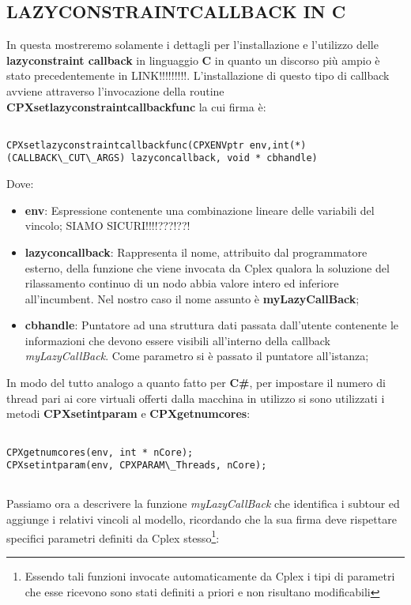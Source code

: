\documentclass[11pt]{article}
\begin{document}
\subsection*{LAZYCONSTRAINTCALLBACK IN C}
\label{sec:LazyDueS}

In questa mostreremo solamente i dettagli per l'installazione e l'utilizzo delle \textbf{lazyconstraint callback} in linguaggio \textbf{C} in quanto un discorso più ampio è stato precedentemente in LINK!!!!!!!!!.
L'installazione di questo tipo di callback avviene attraverso l'invocazione della routine \textbf{CPXsetlazyconstraintcallbackfunc} la cui firma è:

\begin{lstlisting}

CPXsetlazyconstraintcallbackfunc(CPXENVptr env,int(*)(CALLBACK\_CUT\_ARGS) lazyconcallback, void * cbhandle)

\end{lstlisting}

Dove:

\begin{itemize}
    \item \textbf{env}: Espressione contenente una combinazione lineare delle variabili del vincolo; SIAMO SICURI!!!!???!??!
    \item \textbf{lazyconcallback}: Rappresenta il nome, attribuito dal programmatore esterno, della funzione che viene invocata da Cplex qualora la soluzione del rilassamento continuo di un nodo abbia valore intero ed inferiore all'incumbent. Nel nostro caso il nome assunto è \textbf{myLazyCallBack};
    \item \textbf{cbhandle}: Puntatore ad una struttura dati passata dall'utente contenente le informazioni che devono essere visibili all'interno della callback \textit{myLazyCallBack}. Come parametro si è passato il puntatore all'istanza;
\end{itemize}

In modo del tutto analogo a quanto fatto per \textbf{C\#}, per impostare il numero di thread pari ai core virtuali offerti dalla macchina in utilizzo si sono utilizzati i metodi \textbf{CPXsetintparam} e \textbf{CPXgetnumcores}:

\begin{lstlisting}

CPXgetnumcores(env, int * nCore);
CPXsetintparam(env, CPXPARAM\_Threads, nCore);


\end{lstlisting}

Passiamo ora a descrivere la funzione \textit{myLazyCallBack} che identifica i subtour ed aggiunge i relativi vincoli al modello, ricordando che la sua firma deve rispettare specifici parametri definiti da Cplex stesso\footnote{Essendo tali funzioni invocate automaticamente da Cplex i tipi di parametri che esse ricevono sono stati definiti a priori e non risultano modificabili}:
\end{document}
